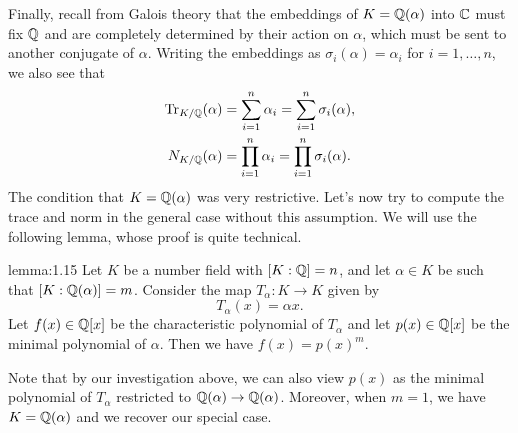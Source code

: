 Finally, recall from Galois theory that the embeddings of $K = \mathbb{Q}(\alpha)$ 
into $\mathbb{C}$ must fix $\mathbb{Q}$ and are completely determined by their action on $\alpha$, 
which must be sent to another conjugate of $\alpha$. Writing the embeddings as 
$\sigma_i(\alpha) = \alpha_i$ for $i = 1, \dots, n$, we also see that 
\begin{align*}
    \operatorname{Tr}_{K/\mathbb{Q}}(\alpha) &= \sum_{i=1}^n \alpha_i = \sum_{i=1}^n \sigma_i(\alpha), \\ 
    N_{K/\mathbb{Q}}(\alpha) &= \prod_{i=1}^n \alpha_i = \prod_{i=1}^n \sigma_i(\alpha).
\end{align*}
The condition that $K = \mathbb{Q}(\alpha)$ was very restrictive. Let's now try 
to compute the trace and norm in the general case without this assumption. 
We will use the following lemma, whose proof is quite technical. 

\begin{lemma}{lemma:1.15}
    Let $K$ be a number field with $[K : \mathbb{Q}] = n$, and let $\alpha \in K$ 
    be such that $[K : \mathbb{Q}(\alpha)] = m$. Consider the map $T_\alpha : 
    K \to K$ given by 
    \[ T_\alpha(x) = \alpha x. \] 
    Let $f(x) \in \mathbb{Q}[x]$ be the 
    characteristic polynomial of $T_\alpha$ and let $p(x) \in \mathbb{Q}[x]$ be the 
    minimal polynomial of $\alpha$. Then we have $f(x) = p(x)^m$. 
\end{lemma}

Note that by our investigation above, we can also view $p(x)$ as the 
minimal polynomial of $T_\alpha$ restricted to $\mathbb{Q}(\alpha) \to \mathbb{Q}(\alpha)$. 
Moreover, when $m = 1$, we have $K = \mathbb{Q}(\alpha)$ and we 
recover our special case. 

